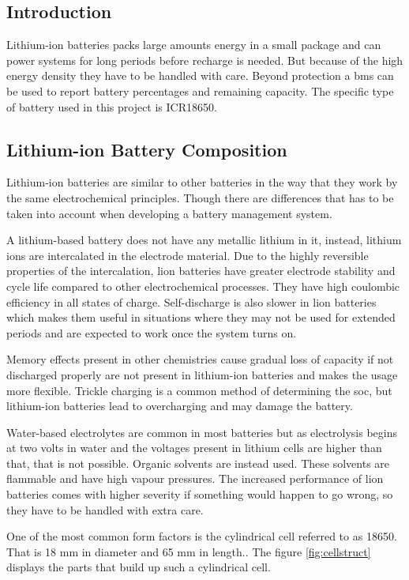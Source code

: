 \subsection{Introduction}
Lithium-ion batteries packs large amounts energy in a small package and can power systems for long periods before recharge is needed. But because of the high energy density they have to be handled with care. Beyond protection a \gls{bms} can be used to report battery percentages and remaining capacity. The specific type of battery used in this project is ICR18650.

\subsection{Lithium-ion Battery Composition}
Lithium-ion batteries are similar to other batteries in the way that they work by the same electrochemical principles. Though there are differences that has to be taken into account when developing a battery management system.

A lithium-based battery does not have any metallic lithium in it, instead, lithium ions are intercalated in the electrode material. Due to the highly reversible properties of the intercalation, \gls{lion} batteries have greater electrode stability and cycle life compared to other electrochemical processes. They have high coulombic efficiency in all states of charge. Self-discharge is also slower in \gls{lion} batteries which makes them useful in situations where they may not be used for extended periods and are expected to work once the system turns on.

Memory effects present in other chemistries cause gradual loss of capacity if not discharged properly are not present in lithium-ion batteries and makes the usage more flexible. Trickle charging is a common method of determining the \gls{soc}, but lithium-ion batteries lead to overcharging and may damage the battery.

Water-based electrolytes are common in most batteries but as electrolysis begins at two volts in water and the voltages present in lithium cells are higher than that, that is not possible. Organic solvents are instead used. These solvents are flammable and have high vapour pressures. The increased performance of \gls{lion} batteries comes with higher severity if something would happen to go wrong, so they have to be handled with extra care.

One of the most common form factors is the cylindrical cell referred to as 18650. That is 18 mm in diameter and 65 mm in length.\cite{book26}. The figure \autoref{fig:cellstruct} displays the parts that build up such a cylindrical cell.

